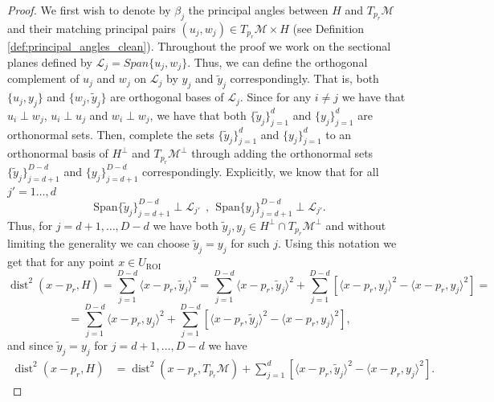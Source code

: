 \documentclass[12pt]{article}
\theoremstyle{remark}
\newcommand{\MM}{\mathcal{M}}
\newcommand{\LL}{\mathcal{L}}
\newcommand{\dist}{\operatorname{dist}}
\newcommand{\lrangle}[1]{\langle #1 \rangle}
\begin{document}
\begin{proof}
We first wish to denote by $\beta_j$ the principal angles between $H$ and $T_{p_r}\MM$ and their matching principal pairs $(u_j, w_j)\in T_{p_r}\MM\times H$ (see Definition \ref{def:principal_angles_clean}).  
Throughout the proof we work on the sectional planes defined by $\LL_j = Span\{u_j,w_j\}$.
Thus, we can define the orthogonal complement of $u_j$ and $w_j$ on $\LL_j$ by $y_j$ and $\tilde y_j$ correspondingly.
That is, both $\{u_j, y_j\}$ and $\{w_j, \tilde y_j\}$ are orthogonal bases of $\LL_j$.
Since for any $i \neq j$ we have that $u_i \perp w_j$, $u_i \perp u_j$ and $w_i \perp w_j$, we have that both $\{\tilde y_j\}_{j=1}^{d}$ and $\{y_j\}_{j=1}^{d}$ are orthonormal sets.
Then, complete the sets $\{\tilde y_j\}_{j=1}^{d}$ and $\{y_j\}_{j=1}^{d}$  to an orthonormal basis of $H^\perp$  and $T_{p_r}\MM^\perp$ through adding the orthonormal sets $\{\tilde y_j\}_{j=d+1}^{D-d}$ and $\{y_j\}_{j=d+1}^{D-d}$ correspondingly.
Explicitly, we know that for all $j' = 1\ldots, d$
$$\textrm{Span}\{\tilde y_j\}_{j=d+1}^{D-d}\perp \LL_{j'} ~~,~~ \textrm{Span}\{ y_j\}_{j=d+1}^{D-d}\perp \LL_{j'}.$$ 
Thus, for $j=d+1, \ldots, D-d$ we have both $\tilde y_j , y_j\in H^\perp \cap T_{p_r}\MM^\perp$ and without limiting the generality we can choose $\tilde y_j = y_j$ for such $j$.
Using this notation we get that for any point $x\in U_\textrm{ROI}$
\[
\dist^2(x - {p_r}, H) = 
\sum_{j=1}^{D-d} \lrangle{x - {p_r}, \tilde y_j}^2 =
\sum_{j=1}^{D-d} \lrangle{x - {p_r}, \tilde y_j}^2 + \sum_{j=1}^{D-d} \left[\lrangle{x - {p_r},  y_j}^2 - \lrangle{x - {p_r},  y_j}^2\right] =
\]
\[
=\sum_{j=1}^{D-d} \lrangle{x - {p_r}, y_j}^2 + \sum_{j=1}^{D-d}\left[ \lrangle{x - {p_r},  \tilde y_j}^2 - \lrangle{x - {p_r},  y_j}^2\right]
,\]
and since $\tilde y_j = y_j$ for $j=d+1,\ldots,D-d$ we have
\begin{align}\label{eq:EJ_1_clean}
	\dist^2(x - {p_r}, H) &=
	\dist^2(x - {p_r}, T_{{p_r}}\MM) + \sum_{j=1}^{d}\left[ \langle x - {p_r}, \tilde{y}_j \rangle^2 - \langle x - {p_r}, {y}_j \rangle^2\right]
.\end{align}


\end{proof}
\end{document}
